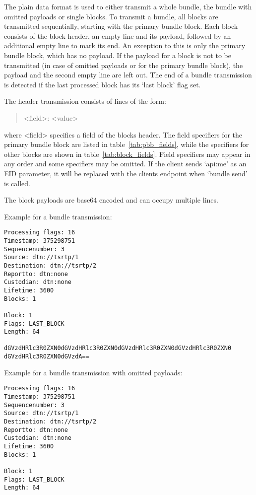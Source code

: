 \documentclass[12pt, a4paper]{scrartcl}
\begin{document}
The plain data format is used to either transmit a whole bundle, the bundle with omitted payloads or single blocks.
To transmit a bundle, all blocks are transmitted sequentially, starting with the primary bundle block.
Each block consists of the block header, an empty line and its payload, followed by an additional empty line to mark its end.
An exception to this is only the primary bundle block, which has no payload.
If the payload for a block is not to be transmitted (in case of omitted payloads or for the primary bundle block), the payload and the second empty line are left out.
The end of a bundle transmission is detected if the last processed block has its `last block' flag set.

The header transmission consists of lines of the form:
\begin{quote}
	<field>: <value>
\end{quote}
where <field> specifies a field of the blocks header.
The field specifiers for the primary bundle block are listed in table~\ref{tab:pbb_fields}, while the specifiers for other blocks are shown in table~\ref{tab:block_fields}.
Field specifiers may appear in any order and some specifiers may be omitted.
If the client sends `api:me' as an EID parameter, it will be replaced with the clients endpoint when `bundle send' is called.

The block payloads are base64 encoded and can occupy multiple lines.

Example for a bundle transmission:\\
\makebox[\textwidth]{\hrulefill}
\begin{verbatim}
Processing flags: 16
Timestamp: 375298751
Sequencenumber: 3
Source: dtn://tsrtp/1
Destination: dtn://tsrtp/2
Reportto: dtn:none
Custodian: dtn:none
Lifetime: 3600
Blocks: 1

Block: 1
Flags: LAST_BLOCK
Length: 64

dGVzdHRlc3R0ZXN0dGVzdHRlc3R0ZXN0dGVzdHRlc3R0ZXN0dGVzdHRlc3R0ZXN0
dGVzdHRlc3R0ZXN0dGVzdA==

\end{verbatim}
\makebox[\textwidth]{\hrulefill}

Example for a bundle transmission with omitted payloads:\\
\makebox[\textwidth]{\hrulefill}
\begin{verbatim}
Processing flags: 16
Timestamp: 375298751
Sequencenumber: 3
Source: dtn://tsrtp/1
Destination: dtn://tsrtp/2
Reportto: dtn:none
Custodian: dtn:none
Lifetime: 3600
Blocks: 1

Block: 1
Flags: LAST_BLOCK
Length: 64

\end{verbatim}
\makebox[\textwidth]{\hrulefill}
\end{document}
